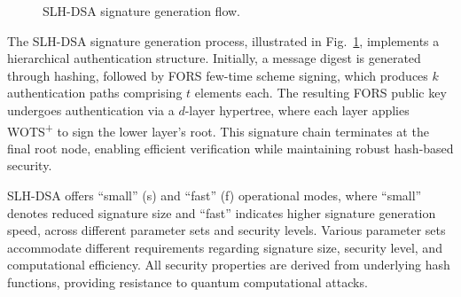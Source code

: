 \documentclass[journal]{IEEEtran}
\begin{document}
\begin{figure}[t]
  \centering
  \caption{SLH-DSA signature generation flow.}
  \label{fig:sphincs-process}
\end{figure}

The SLH-DSA signature generation process, illustrated in Fig.~\ref{fig:sphincs-process}, implements a hierarchical authentication structure. Initially, a message digest is generated through hashing, followed by FORS few-time scheme signing, which produces $k$ authentication paths comprising $t$ elements each. The resulting FORS public key undergoes authentication via a $d$-layer hypertree, where each layer applies WOTS\textsuperscript{+} to sign the lower layer's root. This signature chain terminates at the final root node, enabling efficient verification while maintaining robust hash-based security.

SLH-DSA offers ``small'' (s) and ``fast'' (f) operational modes, where ``small'' denotes reduced signature size and ``fast'' indicates higher signature generation speed, across different parameter sets and security levels. Various parameter sets accommodate different requirements regarding signature size, security level, and computational efficiency. All security properties are derived from underlying hash functions, providing resistance to quantum computational attacks.
\end{document}
